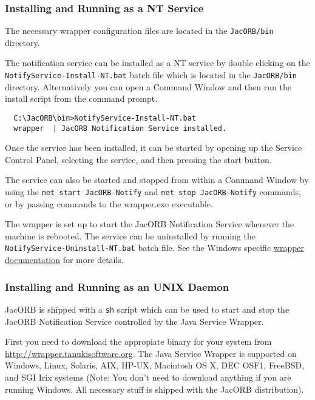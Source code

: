 \subsubsection{Installing and Running as a NT Service}
\label{sec:windows-service}

The necessary wrapper configuration files are located in the
\texttt{JacORB/bin} directory.

The notification service can be installed as a NT service by double
clicking on the \texttt{NotifyService-Install-NT.bat} batch file which
is located in the \texttt{JacORB/bin} directory.
Alternatively you can open a Command Window and then run the install
script from the command prompt.

\begin{verbatim}
  C:\JacORB\bin>NotifyService-Install-NT.bat
  wrapper  | JacORB Notification Service installed.
\end{verbatim}

Once the service has been installed, it can be started by opening up
the Service Control Panel, selecting the service, and then pressing
the start button.

The service can also be started and stopped from within a Command
Window by using the \texttt{net start JacORB-Notify} and \texttt{net
  stop JacORB-Notify} commands, or
by passing commands to the wrapper.exe executable.

The wrapper is set up to start the JacORB Notification Service
whenever the machine is rebooted. The service can be uninstalled by running the
\texttt{NotifyService-Uninstall-NT.bat} batch file. See the Windows specific
\href{http://wrapper.tanukisoftware.org/doc/english/launch-win.html}{wrapper
  documentation} for more details.

\subsubsection{Installing and Running as an UNIX Daemon}
\label{sec:inst-runn-as}

JacORB is shipped with a \texttt{sh} script which can be used to start
and stop the JacORB Notification Service controlled by the Java
Service Wrapper.

First you need to download the appropiate binary for your system from
\href{http://wrapper.tanukisoftware.org}{http://wrapper.tanukisoftware.org}.
The Java Service Wrapper is supported on Windows, Linux, Solaris, AIX,
HP-UX, Macintosh OS X, DEC OSF1, FreeBSD, and SGI Irix systems (Note:
You don't need to download anything if you are running Windows. All
necessary stuff is shipped with the JacORB distribution).

